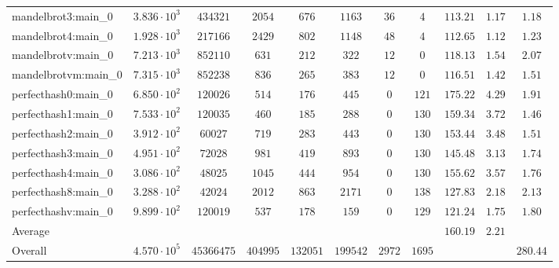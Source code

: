 \begin{tabular}{|l|c|c|c|c|c|c|c|c|c|c|}
mandelbrot3:main\_0            & $ 3.836 \cdot 10^{3} $ & $ 434321   $ & $ 2054   $ & $ 676    $ & $ 1163   $ & $ 36   $ & $ 4    $ & $ 113.21      $ & $ 1.17    $ & $ 1.18    $ \\
mandelbrot4:main\_0            & $ 1.928 \cdot 10^{3} $ & $ 217166   $ & $ 2429   $ & $ 802    $ & $ 1148   $ & $ 48   $ & $ 4    $ & $ 112.65      $ & $ 1.12    $ & $ 1.23    $ \\
mandelbrotv:main\_0            & $ 7.213 \cdot 10^{3} $ & $ 852110   $ & $ 631    $ & $ 212    $ & $ 322    $ & $ 12   $ & $ 0    $ & $ 118.13      $ & $ 1.54    $ & $ 2.07    $ \\
mandelbrotvm:main\_0           & $ 7.315 \cdot 10^{3} $ & $ 852238   $ & $ 836    $ & $ 265    $ & $ 383    $ & $ 12   $ & $ 0    $ & $ 116.51      $ & $ 1.42    $ & $ 1.51    $ \\
perfecthash0:main\_0           & $ 6.850 \cdot 10^{2} $ & $ 120026   $ & $ 514    $ & $ 176    $ & $ 445    $ & $ 0    $ & $ 121  $ & $ 175.22      $ & $ 4.29    $ & $ 1.91    $ \\
perfecthash1:main\_0           & $ 7.533 \cdot 10^{2} $ & $ 120035   $ & $ 460    $ & $ 185    $ & $ 288    $ & $ 0    $ & $ 130  $ & $ 159.34      $ & $ 3.72    $ & $ 1.46    $ \\
perfecthash2:main\_0           & $ 3.912 \cdot 10^{2} $ & $ 60027    $ & $ 719    $ & $ 283    $ & $ 443    $ & $ 0    $ & $ 130  $ & $ 153.44      $ & $ 3.48    $ & $ 1.51    $ \\
perfecthash3:main\_0           & $ 4.951 \cdot 10^{2} $ & $ 72028    $ & $ 981    $ & $ 419    $ & $ 893    $ & $ 0    $ & $ 130  $ & $ 145.48      $ & $ 3.13    $ & $ 1.74    $ \\
perfecthash4:main\_0           & $ 3.086 \cdot 10^{2} $ & $ 48025    $ & $ 1045   $ & $ 444    $ & $ 954    $ & $ 0    $ & $ 130  $ & $ 155.62      $ & $ 3.57    $ & $ 1.76    $ \\
perfecthash8:main\_0           & $ 3.288 \cdot 10^{2} $ & $ 42024    $ & $ 2012   $ & $ 863    $ & $ 2171   $ & $ 0    $ & $ 138  $ & $ 127.83      $ & $ 2.18    $ & $ 2.13    $ \\
perfecthashv:main\_0           & $ 9.899 \cdot 10^{2} $ & $ 120019   $ & $ 537    $ & $ 178    $ & $ 159    $ & $ 0    $ & $ 129  $ & $ 121.24      $ & $ 1.75    $ & $ 1.80    $ \\
\hline
Average                        & $                    $ & $          $ & $        $ & $        $ & $        $ & $      $ & $      $ & $ 160.19      $ & $ 2.21    $ & $         $ \\
\hline
Overall                        & $ 4.570 \cdot 10^{5} $ & $ 45366475 $ & $ 404995 $ & $ 132051 $ & $ 199542 $ & $ 2972 $ & $ 1695 $ & $             $ & $         $ & $ 280.44  $ \\
\hline
\end{tabular}
